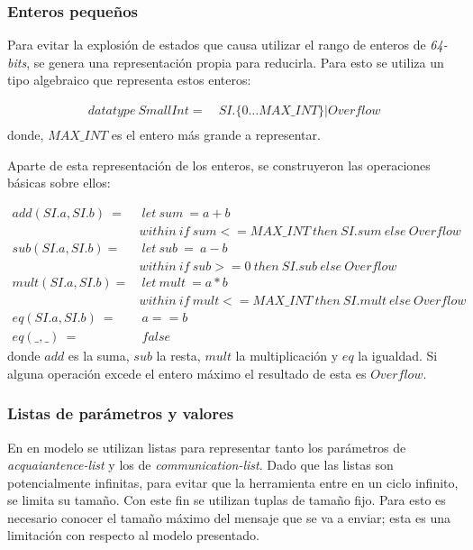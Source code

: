 \subsubsection*{Enteros pequeños}

Para evitar la explosión de estados que causa utilizar el rango de enteros de \textit{64-bits}, se genera una representación propia para reducirla. Para esto se utiliza un tipo algebraico que representa estos enteros:

\begin{align*}
datatype\ SmallInt =&\ SI.\{0 \ldots MAX\_INT\} | Overflow \\
\end{align*}
donde, $MAX\_INT$ es el entero más grande a representar. 

Aparte de esta representación de los enteros, se construyeron las operaciones básicas sobre ellos:

\begin{align*}
add(SI.a, SI.b)\ =&\ let\ sum\ = a + b \\
&within\ if\ sum <= MAX\_INT\ then\ SI.sum\ else\ Overflow  \\
%
sub(SI.a, SI.b) =&\ let\ sub\ =\ a - b \\
& within\ if\ sub >= 0\ then\ SI.sub\ else\ Overflow \\
%
mult(SI.a, SI.b) =&\ let\ mult\ = a * b \\
& within\ if\ mult <= MAX\_INT\ then\ SI.mult\ else\ Overflow \\
eq(SI.a, SI.b)\ =&\ a == b \\
eq(\_, \_)\ =&\ false
\end{align*}
donde $add$ es la suma, $sub$ la resta, $mult$ la multiplicación y $eq$ la igualdad. Si alguna operación excede el entero máximo el resultado de esta es $Overflow$.

\subsubsection*{Listas de parámetros y valores}
En en modelo se utilizan listas para representar tanto los parámetros de \textit{acquaiantence-list} y los de \textit{communication-list}. Dado que las listas son potencialmente infinitas, para evitar que la herramienta entre en un ciclo infinito, se limita su tamaño. Con este fin se utilizan tuplas de tamaño fijo. Para esto es necesario conocer el tamaño máximo del mensaje que se va a enviar; esta es una limitación con respecto al modelo presentado.

